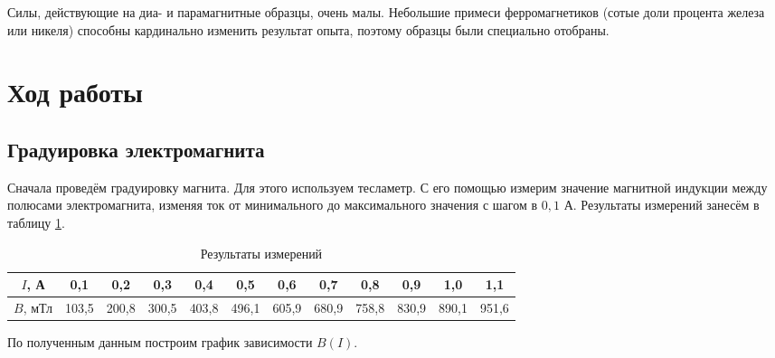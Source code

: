 \documentclass[a4paper,12pt]{article} %
\begin{document}
Силы, действующие на диа- и парамагнитные образцы, очень малы. Небольшие примеси ферромагнетиков (сотые доли процента железа или никеля) способны кардинально изменить результат опыта, поэтому образцы были специально отобраны.

\section{Ход работы}

\subsection{Градуировка электромагнита}

Сначала проведём градуировку магнита. Для этого используем тесламетр. С его помощью измерим значение магнитной индукции между полюсами электромагнита, изменяя ток от минимального до максимального значения с шагом в $ 0,1 $ А. Результаты измерений занесём в таблицу \ref{tab:my-table1}.

\begin{table}[H]
	\centering
	\begin{tabular}{|c|c|c|c|c|c|c|c|c|c|c|c|}
		\hline
		$ I $, А   & 0,1   & 0,2   & 0,3   & 0,4   & 0,5   & 0,6   & 0,7   & 0,8   & 0,9   & 1,0   & 1,1   \\ \hline
		$ B $, мТл & 103,5 & 200,8 & 300,5 & 403,8 & 496,1 & 605,9 & 680,9 & 758,8 & 830,9 & 890,1 & 951,6 \\ \hline
	\end{tabular}
	\caption{Результаты измерений}
	\label{tab:my-table1}
\end{table}

По полученным данным построим график зависимости $ B(I) $.

\begin{center}
\end{center}
\end{document}
